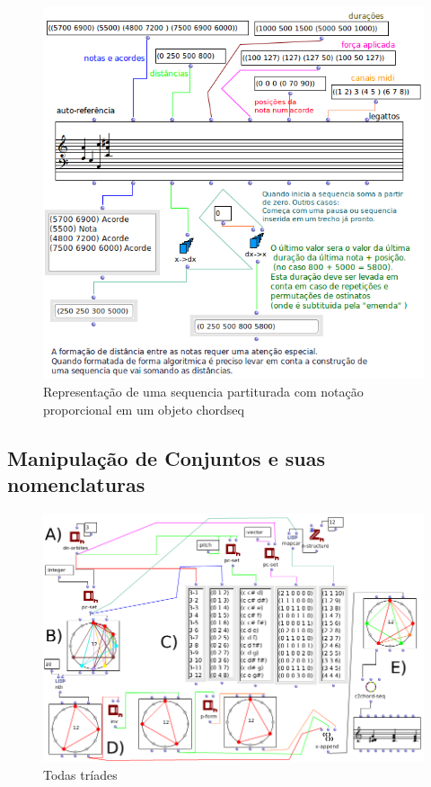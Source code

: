 \documentclass[
	12pt,				%
	openright,			%
	twoside,			%
	a4paper,			%
	english,			%
	french,				%
	spanish,			%
	brazil				%
	]{abntex2}
\begin{document}
\begin{figure}[!h]
	\caption{\label{fig_grafico}Representação de uma sequencia partiturada com notação proporcional em um objeto chord\-seq }
	\begin{center}
	    \includegraphics[scale=0.5]{OMPD/chord-seq-sem-titulo.png}
	\end{center}
\end{figure}

\subsection{Manipulação de Conjuntos e suas nomenclaturas}



\begin{figure}[!h]
	\caption{\label{fig_grafico}Todas tríades }
	\begin{center}
	    \includegraphics[scale=0.5]{OM_settheory/todas_triades.png}
	\end{center}
\end{figure}
\end{document}
